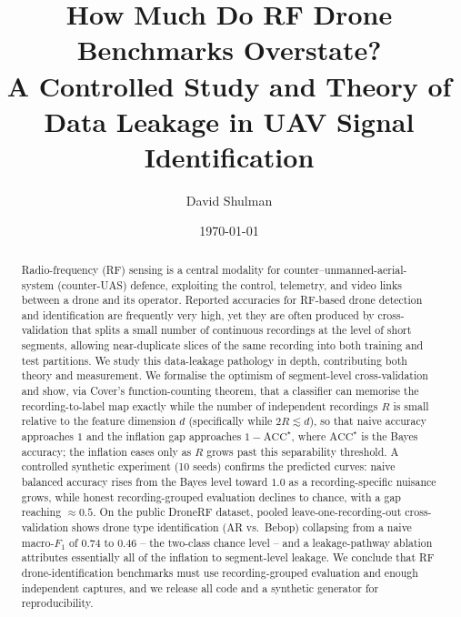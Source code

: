 \documentclass[11pt]{article}
\title{How Much Do RF Drone Benchmarks Overstate?\\ A Controlled Study and Theory of Data Leakage in UAV Signal Identification}
\author{David Shulman}
\affil{\small\texttt{github.com/shulm/spectrahawk}}
\date{\today}
\begin{document}
\maketitle
\begin{abstract}
Radio-frequency (RF) sensing is a central modality for counter--unmanned-aerial-system (counter-UAS) defence, exploiting the control, telemetry, and video links between a drone and its operator. Reported accuracies for RF-based drone detection and identification are frequently very high, yet they are often produced by cross-validation that splits a small number of continuous recordings at the level of short segments, allowing near-duplicate slices of the same recording into both training and test partitions. We study this data-leakage pathology in depth, contributing both theory and measurement. We formalise the optimism of segment-level cross-validation and show, via Cover's function-counting theorem, that a classifier can memorise the recording-to-label map exactly while the number of independent recordings $R$ is small relative to the feature dimension $d$ (specifically while $2R \lesssim d$), so that naive accuracy approaches $1$ and the inflation gap approaches $1-\mathrm{ACC}^\star$, where $\mathrm{ACC}^\star$ is the Bayes accuracy; the inflation eases only as $R$ grows past this separability threshold. A controlled synthetic experiment (10 seeds) confirms the predicted curves: naive balanced accuracy rises from the Bayes level toward $1.0$ as a recording-specific nuisance grows, while honest recording-grouped evaluation declines to chance, with a gap reaching $\approx 0.5$. On the public DroneRF dataset, pooled leave-one-recording-out cross-validation shows drone type identification (AR vs.\ Bebop) collapsing from a naive macro-$F_1$ of $0.74$ to $0.46$ -- the two-class chance level -- and a leakage-pathway ablation attributes essentially all of the inflation to segment-level leakage. We conclude that RF drone-identification benchmarks must use recording-grouped evaluation and enough independent captures, and we release all code and a synthetic generator for reproducibility.
\end{abstract}
\end{document}
